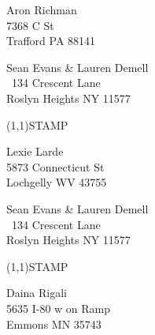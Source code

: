 \documentclass[12pt]{article}
\begin{document}
\begin{center} \begin{Huge} \vspace*{\fill}
Aron Richman\\
7368 C St\\
Trafford PA 88141\\
\vspace{\fill} \end{Huge} \end{center}

\clearpage

\begin{minipage}{.5\linewidth} \noindent
Sean Evans \& Lauren Demell\\\ 
134 Crescent Lane\\ 
Roslyn Heights NY 11577
\end{minipage}
\begin{minipage}{.5\linewidth \hspace{-.2in} \vspace{-.3in}}
\begin{flushright}
\framebox(1,1){STAMP}
\end{flushright}
\end{minipage}

\begin{center} \begin{Huge} \vspace*{\fill}
Lexie Larde\\
5873 Connecticut St\\
Lochgelly WV 43755\\
\vspace{\fill} \end{Huge} \end{center}

\clearpage

\begin{minipage}{.5\linewidth} \noindent
Sean Evans \& Lauren Demell\\\ 
134 Crescent Lane\\ 
Roslyn Heights NY 11577
\end{minipage}
\begin{minipage}{.5\linewidth \hspace{-.2in} \vspace{-.3in}}
\begin{flushright}
\framebox(1,1){STAMP}
\end{flushright}
\end{minipage}

\begin{center} \begin{Huge} \vspace*{\fill}
Daina Rigali\\
5635 I-80 w on Ramp\\
Emmons MN 35743\\
\vspace{\fill} \end{Huge} \end{center}
\end{document}
